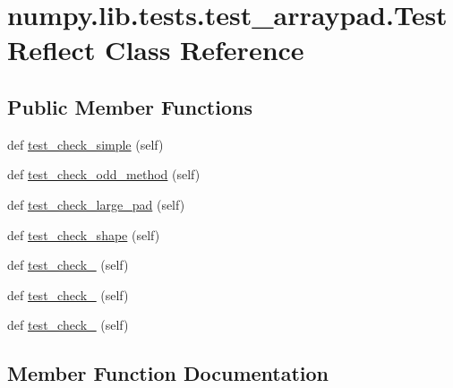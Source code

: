 \hypertarget{classnumpy_1_1lib_1_1tests_1_1test__arraypad_1_1TestReflect}{}\section{numpy.\+lib.\+tests.\+test\+\_\+arraypad.\+Test\+Reflect Class Reference}
\label{classnumpy_1_1lib_1_1tests_1_1test__arraypad_1_1TestReflect}
\subsection*{Public Member Functions}
\begin{DoxyCompactItemize}
\item 
def \hyperlink{classnumpy_1_1lib_1_1tests_1_1test__arraypad_1_1TestReflect_a117aeb2c5d6c9b04e20e2677c1586540}{test\+\_\+check\+\_\+simple} (self)
\item 
def \hyperlink{classnumpy_1_1lib_1_1tests_1_1test__arraypad_1_1TestReflect_a240a20e9178e34f386b7e647246507bb}{test\+\_\+check\+\_\+odd\+\_\+method} (self)
\item 
def \hyperlink{classnumpy_1_1lib_1_1tests_1_1test__arraypad_1_1TestReflect_a5bc4bc791f8a05f8d981c1c6da2b826e}{test\+\_\+check\+\_\+large\+\_\+pad} (self)
\item 
def \hyperlink{classnumpy_1_1lib_1_1tests_1_1test__arraypad_1_1TestReflect_a5ef46c52f6f345bd6c6bc92c7695c796}{test\+\_\+check\+\_\+shape} (self)
\item 
def \hyperlink{classnumpy_1_1lib_1_1tests_1_1test__arraypad_1_1TestReflect_a56e2e7a9d0ecd85ad2b0b8f2dacc9fbe}{test\+\_\+check\+\_} (self)
\item 
def \hyperlink{classnumpy_1_1lib_1_1tests_1_1test__arraypad_1_1TestReflect_a6a9a59a54f991135b336c19d300367b5}{test\+\_\+check\+\_} (self)
\item 
def \hyperlink{classnumpy_1_1lib_1_1tests_1_1test__arraypad_1_1TestReflect_a268774b6ca2ab387d8e6ca09b379fb37}{test\+\_\+check\+\_} (self)
\end{DoxyCompactItemize}


\subsection{Member Function Documentation}
\mbox{\label{classnumpy_1_1lib_1_1tests_1_1test__arraypad_1_1TestReflect_a56e2e7a9d0ecd85ad2b0b8f2dacc9fbe}} 
